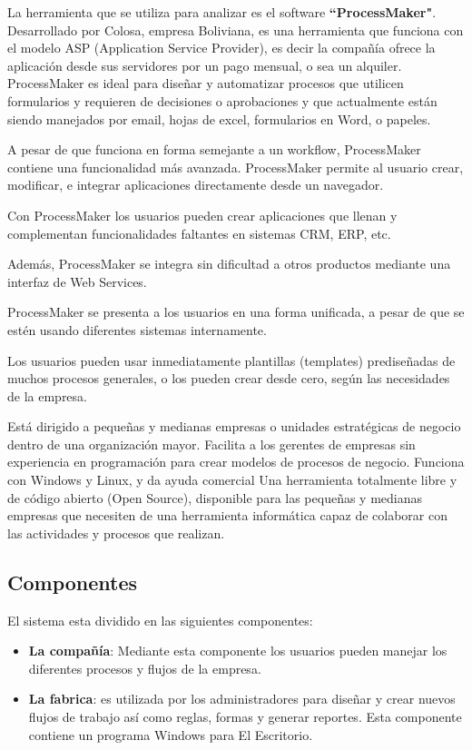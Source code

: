 La herramienta que se utiliza para analizar es el software \textbf{``ProcessMaker"}.
\\
Desarrollado por Colosa, empresa Boliviana, es una herramienta que funciona con el modelo ASP (Application Service Provider), es decir la compañía ofrece la aplicación desde sus servidores por un pago mensual, o sea un alquiler.
ProcessMaker es ideal para diseñar y automatizar procesos que utilicen formularios y requieren de decisiones o aprobaciones y que actualmente están siendo manejados por email, hojas de excel, formularios en Word, o papeles.

A pesar de que funciona en forma semejante a un workflow, ProcessMaker contiene una funcionalidad más avanzada. ProcessMaker permite al usuario crear, modificar, e integrar aplicaciones directamente desde un navegador.

Con ProcessMaker los usuarios pueden crear aplicaciones que llenan y complementan funcionalidades faltantes en sistemas CRM, ERP, etc.

Además, ProcessMaker se integra sin dificultad a otros productos mediante una interfaz de Web Services.

ProcessMaker se presenta a los usuarios en una forma unificada, a pesar de que se estén usando diferentes sistemas internamente.

Los usuarios pueden usar inmediatamente plantillas (templates) prediseñadas de muchos procesos generales, o los pueden crear desde cero, según las necesidades de la empresa.

Está dirigido a pequeñas y medianas empresas o unidades estratégicas de negocio dentro de una organización mayor. Facilita a los gerentes de empresas sin experiencia en programación para crear modelos de procesos de negocio. Funciona con Windows y Linux, y da ayuda comercial
Una herramienta totalmente libre y de código abierto (Open Source), disponible para las pequeñas y medianas empresas que necesiten de una herramienta informática capaz de colaborar con las actividades y procesos que realizan.

\subsection{Componentes}
El sistema esta dividido en las siguientes componentes:
\begin{itemize}
\item  \textbf{La compañía}: Mediante esta componente los usuarios pueden manejar los diferentes procesos y flujos de la empresa.
\item \textbf{La fabrica}: es utilizada por los administradores para diseñar y crear nuevos flujos de trabajo así como reglas, formas y generar reportes. Esta componente contiene un programa Windows para El Escritorio.
\end{itemize}

